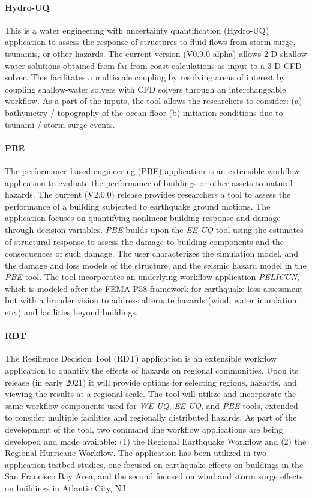 \paragraph{Hydro-UQ} This is a water engineering with uncertainty quantification (Hydro-UQ) application to assess the response of structures to fluid flows from storm surge, tsunamis, or other hazards. The current version (V0.9.0-alpha) allows 2-D shallow water solutions obtained from far-from-coast calculations as input to a 3-D CFD solver. This facilitates a multiscale coupling by resolving areas of interest by coupling shallow-water solvers with CFD solvers through an interchangeable workflow. As a part of the inputs, the tool allows the researchers to consider: (a) bathymetry / topography of the ocean floor (b) initiation conditions due to tsunami / storm surge events. 

\paragraph{PBE} The performance-based engineering (PBE) application is an extensible workflow application to evaluate the performance of buildings or other assets to natural hazards. The current (V2.0.0) release provides researchers a tool to assess the performance of a building subjected to earthquake ground motions. The application focuses on quantifying nonlinear building response and damage through decision variables. \emph{PBE} builds upon the \emph{EE-UQ} tool using the estimates of structural response to assess the damage to building components and the consequences of such damage. The user characterizes the simulation model, and the damage and loss models of the structure, and the seismic hazard model in the \emph{PBE} tool. The tool incorporates an underlying workflow application \emph{PELICUN}, which is modeled after the FEMA P58 framework for earthquake loss assessment but with a broader vision to address alternate hazards (wind, water inundation, etc.) and facilities beyond buildings. 

\paragraph{RDT} The Resilience Decision Tool (RDT) application is an extensible workflow application to quantify the effects of hazards on regional communities. Upon its release (in early 2021) it will provide options for selecting regions, hazards, and viewing the results at a regional scale. The tool will utilize and incorporate the same workflow components used for \emph{WE-UQ}, \emph{EE-UQ}, and \emph{PBE} tools, extended to consider multiple facilities and regionally distributed hazards. As part of the development of the tool, two command line workflow applications are being developed and made available: (1) the Regional Earthquake Workflow and (2) the Regional Hurricane Workflow.  The application has been utilized in two application testbed studies, one focused on earthquake effects on buildings in the San Francisco Bay Area, and the second focused on wind and storm surge effects on buildings in Atlantic City, NJ.

